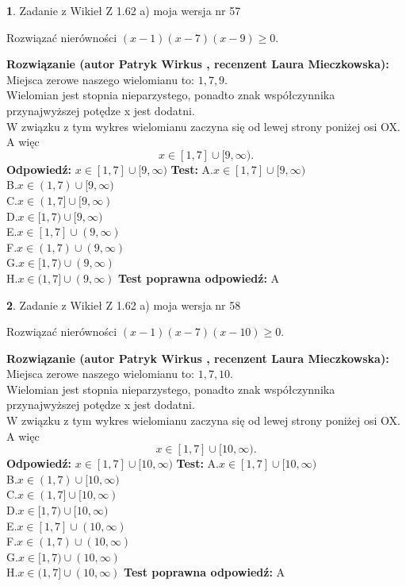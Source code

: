 \documentclass[12pt, a4paper]{article}
\theoremstyle{definition} %
\newtheorem{zad}{}
\newcommand{\zadStart}[1]{\begin{zad}#1\newline}
\newcommand{\zadStop}{\end{zad}}
\newcommand{\rozwStart}[2]{\noindent \textbf{Rozwiązanie (autor #1 , recenzent #2): }\newline}
\newcommand{\rozwStop}{\newline}
\newcommand{\odpStart}{\noindent \textbf{Odpowiedź:}\newline}
\newcommand{\odpStop}{\newline}
\newcommand{\testStart}{\noindent \textbf{Test:}\newline}
\newcommand{\testStop}{\newline}
\newcommand{\kluczStart}{\noindent \textbf{Test poprawna odpowiedź:}\newline}
\newcommand{\kluczStop}{\newline}
\begin{document}
\zadStart{Zadanie z Wikieł Z 1.62 a) moja wersja nr 57}

Rozwiązać nierówności $(x-1)(x-7)(x-9)\ge0$.
\zadStop
\rozwStart{Patryk Wirkus}{Laura Mieczkowska}
Miejsca zerowe naszego wielomianu to: $1, 7, 9$.\\
Wielomian jest stopnia nieparzystego, ponadto znak współczynnika przy\linebreak najwyższej potędze x jest dodatni.\\ W związku z tym wykres wielomianu zaczyna się od lewej strony poniżej osi OX. A więc $$x \in [1,7] \cup [9,\infty).$$
\rozwStop
\odpStart
$x \in [1,7] \cup [9,\infty)$
\odpStop
\testStart
A.$x \in [1,7] \cup [9,\infty)$\\
B.$x \in (1,7) \cup [9,\infty)$\\
C.$x \in (1,7] \cup [9,\infty)$\\
D.$x \in [1,7) \cup [9,\infty)$\\
E.$x \in [1,7] \cup (9,\infty)$\\
F.$x \in (1,7) \cup (9,\infty)$\\
G.$x \in [1,7) \cup (9,\infty)$\\
H.$x \in (1,7] \cup (9,\infty)$
\testStop
\kluczStart
A
\kluczStop



\zadStart{Zadanie z Wikieł Z 1.62 a) moja wersja nr 58}

Rozwiązać nierówności $(x-1)(x-7)(x-10)\ge0$.
\zadStop
\rozwStart{Patryk Wirkus}{Laura Mieczkowska}
Miejsca zerowe naszego wielomianu to: $1, 7, 10$.\\
Wielomian jest stopnia nieparzystego, ponadto znak współczynnika przy\linebreak najwyższej potędze x jest dodatni.\\ W związku z tym wykres wielomianu zaczyna się od lewej strony poniżej osi OX. A więc $$x \in [1,7] \cup [10,\infty).$$
\rozwStop
\odpStart
$x \in [1,7] \cup [10,\infty)$
\odpStop
\testStart
A.$x \in [1,7] \cup [10,\infty)$\\
B.$x \in (1,7) \cup [10,\infty)$\\
C.$x \in (1,7] \cup [10,\infty)$\\
D.$x \in [1,7) \cup [10,\infty)$\\
E.$x \in [1,7] \cup (10,\infty)$\\
F.$x \in (1,7) \cup (10,\infty)$\\
G.$x \in [1,7) \cup (10,\infty)$\\
H.$x \in (1,7] \cup (10,\infty)$
\testStop
\kluczStart
A
\kluczStop
\end{document}
